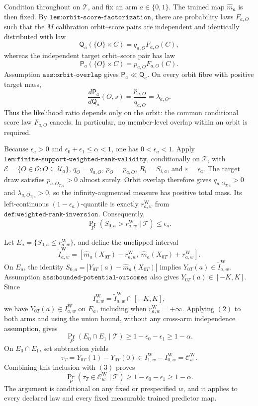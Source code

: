 Condition throughout on \(\mathcal T\), and fix an arm \(a\in\{0,1\}\). The trained map \(\widehat m_a\) is then fixed. By \(\texttt{lem:orbit-score-factorization}\), there are probability laws \(F_{a,O}\) such that the \(M\) calibration orbit--score pairs are independent and identically distributed with law
\[
\mathsf Q_a(\{O\}\times C)=q_{a,O}F_{a,O}(C),
\]
whereas the independent target orbit--score pair has law
\[
\mathsf P_a(\{O\}\times C)=p_{a,O}F_{a,O}(C).
\]
Assumption \(\texttt{ass:orbit-overlap}\) gives \(\mathsf P_a\ll\mathsf Q_a\). On every orbit fibre with positive target mass,
\[
\frac{d\mathsf P_a}{d\mathsf Q_a}(O,s)=\frac{p_{a,O}}{q_{a,O}}=\lambda_{a,O}.
\tag{1}
\]
Thus the likelihood ratio depends only on the orbit: the common conditional score law \(F_{a,O}\) cancels. In particular, no member-level overlap within an orbit is required.

Because \(\epsilon_a>0\) and \(\epsilon_0+\epsilon_1\le\alpha<1\), one has \(0<\epsilon_a<1\). Apply \(\texttt{lem:finite-support-weighted-rank-validity}\), conditionally on \(\mathcal T\), with \(\mathscr E=\{O\in\mathcal O:O\subseteq\mathcal U_a\}\), \(q_O=q_{a,O}\), \(p_O=p_{a,O}\), \(R_i=S_{i,a}\), and \(\varepsilon=\epsilon_a\). The target draw satisfies \(p_{a,O_{T,a}}>0\) almost surely. Orbit overlap therefore gives \(q_{a,O_{T,a}}>0\) and \(\lambda_{a,O_{T,a}}>0\), so the infinity-augmented measure has positive total mass. Its left-continuous \((1-\epsilon_a)\)-quantile is exactly \(r^{\mathrm W}_{a,w}\) from \(\texttt{def:weighted-rank-inversion}\). Consequently,
\[
\Pr_P\!\left(S_{0,a}>r^{\mathrm W}_{a,w}\mid\mathcal T\right)\le\epsilon_a.
\tag{2}
\]

Let \(E_a=\{S_{0,a}\le r^{\mathrm W}_{a,w}\}\), and define the unclipped interval
\[
\widetilde I^{\mathrm W}_{a,w}=\left[\widehat m_a(X_{0T})-r^{\mathrm W}_{a,w},\,\widehat m_a(X_{0T})+r^{\mathrm W}_{a,w}\right].
\]
On \(E_a\), the identity \(S_{0,a}=|Y_{0T}(a)-\widehat m_a(X_{0T})|\) implies \(Y_{0T}(a)\in\widetilde I^{\mathrm W}_{a,w}\). Assumption \(\texttt{ass:bounded-potential-outcomes}\) also gives \(Y_{0T}(a)\in[-K,K]\). Since
\[
I^{\mathrm W}_{a,w}=\widetilde I^{\mathrm W}_{a,w}\cap[-K,K],
\]
we have \(Y_{0T}(a)\in I^{\mathrm W}_{a,w}\) on \(E_a\), including when \(r^{\mathrm W}_{a,w}=+\infty\). Applying \((2)\) to both arms and using the union bound, without any cross-arm independence assumption, gives
\[
\Pr_P(E_0\cap E_1\mid\mathcal T)\ge1-\epsilon_0-\epsilon_1\ge1-\alpha.
\tag{3}
\]
On \(E_0\cap E_1\), set subtraction yields
\[
\tau_T=Y_{0T}(1)-Y_{0T}(0)\in I^{\mathrm W}_{1,w}-I^{\mathrm W}_{0,w}=\mathcal C^{\mathrm W}_w.
\]
Combining this inclusion with \((3)\) proves
\[
\Pr_P(\tau_T\in\mathcal C^{\mathrm W}_w\mid\mathcal T)\ge1-\epsilon_0-\epsilon_1\ge1-\alpha.
\]
The argument is conditional on any fixed or prespecified \(w\), and it applies to every declared law and every fixed measurable trained predictor map.

